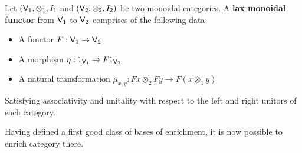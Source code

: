 \documentclass[10pt,a4paper]{article}
\newcommand{\cat}[1]{\textcat{#1}}
\newcommand{\textcat}[1]{{\normalfont\textsf{#1}}}
\theoremstyle{plain}
\theoremstyle{definition}
\theoremstyle{remark}
\begin{document}
\begin{definition}
    Let $(\cat V_1, \otimes_1, I_1$ and $(\cat V_2, \otimes_2, I_2)$ be two monoidal categories. A \textbf{lax monoidal functor} from $\cat V_1$ to $\cat V_2$ comprises of the following data:
    \begin{itemize}
        \item A functor $F : \cat V_1 \to \cat V_2$
        \item A morphism $\eta : 1_{\cat V_1} \to F1_{\cat V_2}$
        \item A natural transformation $\mu_{x, y} : Fx\otimes_2 Fy \to F(x\otimes_1y)$
    \end{itemize}
    Satisfying associativity and unitality with respect to the left and right unitors of each category.
\end{definition}

Having defined a first good class of bases of enrichment, it is now possible to enrich category there.
\end{document}
